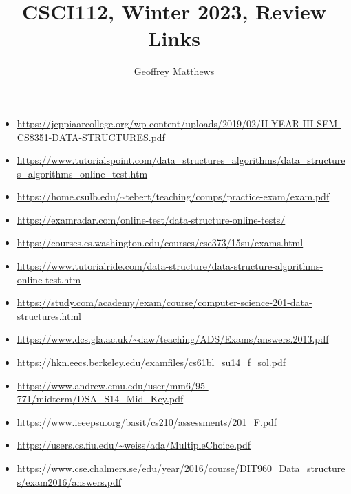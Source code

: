 \documentclass{article}
\title{CSCI112, Winter 2023, Review Links}
\author{Geoffrey Matthews}
\newcommand{\li}[1]{\item \url{#1}}
\begin{document}
\maketitle
\begin{itemize}

\li{https://jeppiaarcollege.org/wp-content/uploads/2019/02/II-YEAR-III-SEM-CS8351-DATA-STRUCTURES.pdf}

\li{https://www.tutorialspoint.com/data_structures_algorithms/data_structures_algorithms_online_test.htm}

\li{https://home.csulb.edu/~tebert/teaching/comps/practice-exam/exam.pdf}

\li{https://examradar.com/online-test/data-structure-online-tests/}

\li{https://courses.cs.washington.edu/courses/cse373/15su/exams.html}

\li{https://www.tutorialride.com/data-structure/data-structure-algorithms-online-test.htm}

\li{https://study.com/academy/exam/course/computer-science-201-data-structures.html}

\li{https://www.dcs.gla.ac.uk/~daw/teaching/ADS/Exams/answers.2013.pdf}

\li{https://hkn.eecs.berkeley.edu/examfiles/cs61bl_su14_f_sol.pdf}

\li{https://www.andrew.cmu.edu/user/mm6/95-771/midterm/DSA_S14_Mid_Key.pdf}

\li{https://www.ieeepsu.org/basit/cs210/assessments/201_F.pdf}

\li{https://users.cs.fiu.edu/~weiss/ada/MultipleChoice.pdf}

\li{https://www.cse.chalmers.se/edu/year/2016/course/DIT960_Data_structures/exam2016/answers.pdf}


\end{itemize}
\end{document}
